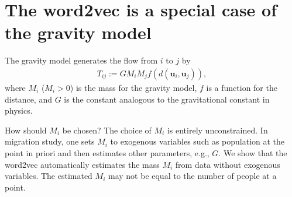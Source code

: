 \documentclass[12pt]{article} %
\def\vec#1{{\bm #1}}
\begin{document}
\section{The word2vec is a special case of the gravity model}

The gravity model generates the flow from $i$ to $j$ by 
\begin{align}
    \label{eq:gravity_model}
    T_{ij}:= G M_i M_j f\left(d(\vec{u}_i,\vec{u}_j)\right),
\end{align}
where $M_i$ ($M_i>0$) is the mass for the gravity model, $f$ is a function for the distance, and 
$G$ is the constant analogous to the gravitational constant in physics.  

How should $M_i$ be chosen? The choice of $M_i$ is entirely unconstrained.
In migration study, one sets $M_i$ to exogenous variables such as population at the point in priori and then estimates other parameters, e.g., $G$.
We show that the word2vec automatically estimates the mass $M_i$ from data without exogenous variables. 
The estimated $M_i$ may not be equal to the number of people at a point.
\end{document}
